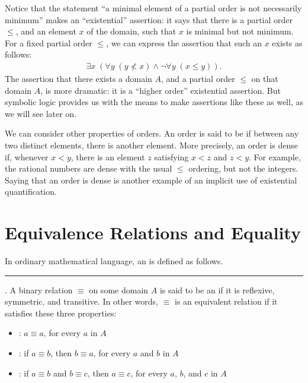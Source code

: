 \documentclass[letterpaper,10pt,english]{sphinxmanual}
\begin{document}
\sphinxAtStartPar
Notice that the statement “a minimal element of a partial order is not necessarily minimum” makes an “existential” assertion: it says that there is a partial order \(\leq\), and an element \(x\) of the domain, such that \(x\) is minimal but not minimum. For a fixed partial order \(\leq\), we can express the assertion that such an \(x\) exists as follows:
\begin{equation*}
\begin{split}\exists x \; (\forall y \; (y \nless x) \wedge \neg \forall y \; (x \leq y)).\end{split}
\end{equation*}
\sphinxAtStartPar
The assertion that there exists a domain \(A\), and a partial order \(\leq\) on that domain \(A\), is more dramatic: it is a “higher order” existential assertion. But symbolic logic provides us with the means to make assertions like these as well, as we will see later on.

\sphinxAtStartPar
We can consider other properties of orders. An order is said to be  if between any two distinct elements, there is another element. More precisely, an order is dense if, whenever \(x < y\), there is an element \(z\) satisfying \(x < z\) and \(z < y\). For example, the rational numbers are dense with the usual \(\leq\) ordering, but not the integers. Saying that an order is dense is another example of an implicit use of existential quantification.


\section{Equivalence Relations and Equality}
\label{\detokenize{relations:equivalence-relations-and-equality}}\label{\detokenize{relations:id3}}
\sphinxAtStartPar
In ordinary mathematical language, an  is defined as follows.


\bigskip\hrule\bigskip


\sphinxAtStartPar
{}. A binary relation \(\equiv\) on some domain \(A\) is said to be an  if it is reflexive, symmetric, and transitive. In other words, \(\equiv\) is an equivalent relation if it satisfies these three properties:
\begin{itemize}
\item {} 
\sphinxAtStartPar
{}: \(a \equiv a\), for every \(a\) in \(A\)

\item {} 
\sphinxAtStartPar
{}: if \(a \equiv b\), then \(b \equiv a\), for every \(a\) and \(b\) in \(A\)

\item {} 
\sphinxAtStartPar
{}: if \(a \equiv b\) and \(b \equiv c\), then \(a \equiv c\), for every \(a\), \(b\), and \(c\) in \(A\)

\end{itemize}
\end{document}

